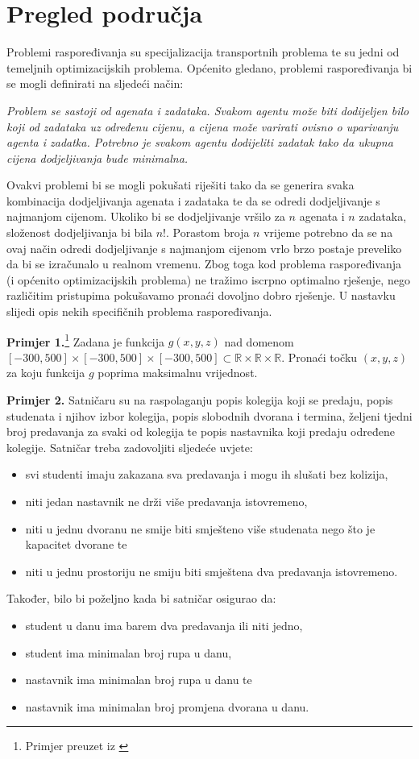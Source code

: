 \documentclass[times, utf8, zavrsni]{fer}
\begin{document}
\chapter{Pregled područja}
Problemi raspoređivanja su specijalizacija transportnih problema te su jedni od temeljnih optimizacijskih problema.
Općenito gledano, problemi raspoređivanja bi se mogli definirati na sljedeći način:
\begin{framed}
\emph{Problem se sastoji od agenata i zadataka. Svakom agentu može biti dodijeljen bilo koji od zadataka uz određenu cijenu, a cijena
može varirati ovisno o uparivanju agenta i zadatka. Potrebno je svakom agentu dodijeliti zadatak tako da ukupna cijena dodjeljivanja
bude minimalna.}
\end{framed}

Ovakvi problemi bi se mogli pokušati riješiti tako da se generira svaka kombinacija dodjeljivanja agenata i zadataka te da se
odredi dodjeljivanje s najmanjom cijenom. Ukoliko bi se dodjeljivanje vršilo za $n$ agenata i $n$ zadataka, složenost dodjeljivanja bi bila $n!$. Porastom broja $n$ vrijeme potrebno da se na ovaj način odredi dodjeljivanje s najmanjom cijenom vrlo brzo postaje preveliko da bi se izračunalo u realnom vremenu. Zbog toga kod problema raspoređivanja (i općenito optimizacijskih problema) ne tražimo iscrpno optimalno rješenje, nego različitim pristupima pokušavamo pronaći dovoljno dobro rješenje. U nastavku slijedi opis nekih specifičnih problema raspoređivanja.

\textbf{Primjer 1.}\footnote{Primjer preuzet iz \citep{cupic2013prirodom}}
Zadana je funkcija $g(x, y, z)$ nad domenom $[-300, 500] \times [-300, 500] \times [-300, 500] \subset
\mathbb{R} \times \mathbb{R} \times \mathbb{R}$. Pronaći točku $(x, y, z)$ za koju funkcija $g$ poprima maksimalnu vrijednost.

\textbf{Primjer 2.} Satničaru su na raspolaganju popis kolegija koji se predaju, popis studenata i njihov izbor kolegija, popis slobodnih dvorana i termina,
željeni tjedni broj predavanja za svaki od kolegija te popis nastavnika koji predaju određene kolegije. Satničar treba zadovoljiti
sljedeće uvjete:
\begin{itemize}
  \item svi studenti imaju zakazana sva predavanja i mogu ih slušati bez kolizija,
  \item niti jedan nastavnik ne drži više predavanja istovremeno,
  \item niti u jednu dvoranu ne smije biti smješteno više studenata nego što je kapacitet dvorane te
  \item niti u jednu prostoriju ne smiju biti smještena dva predavanja istovremeno.
\end{itemize}
Također, bilo bi poželjno kada bi satničar osigurao da:
\begin{itemize}
  \item student u danu ima barem dva predavanja ili niti jedno,
  \item student ima minimalan broj rupa u danu,
  \item nastavnik ima minimalan broj rupa u danu te
  \item nastavnik ima minimalan broj promjena dvorana u danu.
\end{itemize}
\end{document}
